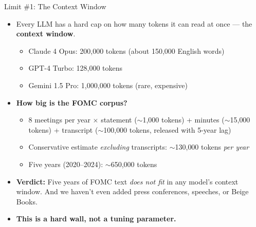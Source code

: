 \documentclass[10pt,english,aspectratio=169]{beamer}
\begin{document}
\begin{frame}{Limit \#1: The Context Window}
\begin{itemize}
\item Every LLM has a hard cap on how many tokens it can read at once --- the \textbf{context window}.
\begin{itemize}
    \item Claude 4 Opus: 200{,}000 tokens (about 150{,}000 English words)
    \item GPT-4 Turbo: 128{,}000 tokens
    \item Gemini 1.5 Pro: 1{,}000{,}000 tokens (rare, expensive)
\end{itemize}

\medskip
\item \textbf{How big is the FOMC corpus?}
\begin{itemize}
    \item 8 meetings per year $\times$ statement ($\sim$1{,}000 tokens) + minutes ($\sim$15{,}000 tokens) + transcript ($\sim$100{,}000 tokens, released with 5-year lag)
    \item Conservative estimate \emph{excluding} transcripts: $\sim$130{,}000 tokens \emph{per year}
    \item Five years (2020--2024): $\sim$650{,}000 tokens
\end{itemize}

\medskip
\item \textbf{Verdict:} Five years of FOMC text \emph{does not fit} in any model's context window. And we haven't even added press conferences, speeches, or Beige Books.

\medskip
\item \textbf{This is a hard wall, not a tuning parameter.}
\end{itemize}
\end{frame}
\end{document}
